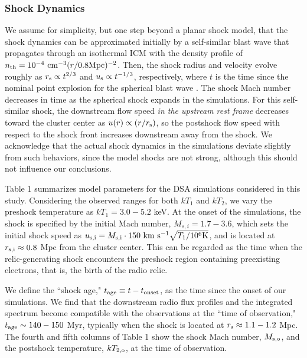 \documentclass[twocolumn]{aastex61}
\def\kms{~{\rm km~s^{-1}}}
\def\cm3{~{\rm cm^{-3}}}
\begin{document}
\subsubsection{Shock Dynamics}

We assume for simplicity, but one step beyond a planar shock model, that the shock dynamics can be approximated initially by a self-similar blast wave
that propagates through an isothermal ICM with the density profile of $n_{\rm th}= 10^{-4} \cm3 (r/0.8 {\rm Mpc})^{-2}$.
Then, the shock radius and velocity evolve roughly as $r_{\rm s}\propto t^{2/3}$ and $u_{\rm s}\propto t^{-1/3}$,
respectively, where $t$ is the time since the nominal point explosion for the spherical blast wave \citep[e.g.,][]{ryu91}.
The shock Mach number decreases in time as the spherical shock expands in the simulations.
For this self-similar shock, the downstream flow speed {\it in the upstream rest frame} decreases toward the cluster center
as $u(r)\propto (r/r_{\rm s})$,
so the postshock flow speed with respect to the shock front increases downstream away from the shock.
We acknowledge that the actual shock dynamics in the simulations deviate slightly from such behaviors, since the model shocks are not strong, although this should not influence our conclusions.

Table 1 summarizes model parameters for the DSA simulations considered in this study. 
Considering the observed ranges for both $kT_1$ and $kT_2$, we vary 
the preshock temperature as $kT_1=3.0-5.2$ keV.
At the onset of the simulations, the shock is specified by the initial Mach number, $M_{s,i}=1.7-3.6$,
which sets the initial shock speed as $u_{\rm s,i}= M_{\rm s,i}\cdot 150\kms \sqrt{T_1/10^6{\rm K}} $,
and is located at $r_{\rm s,i}\approx 0.8$ Mpc from the cluster center. 
This can be regarded as the time when the relic-generating shock encounters the preshock region containing preexisting electrons,
that is, the birth of the radio relic.

We define the ``shock age," $t_{\rm age}\equiv t - t_{\rm onset}$, as the time since the onset of our simulations.
We find that the downstream radio flux profiles and the integrated spectrum become compatible with the observations 
at the ``time of observation," $t_{\rm age}\sim 140-150$ Myr, typically when the shock is located at $r_{\rm s}\approx 1.1-1.2$ Mpc. 
The fourth and fifth columns of Table 1 show the shock Mach number, $M_{\rm s,o}$, and the postshock temperature, 
$kT_{\rm 2,o}$, at the time of observation.
\end{document}
